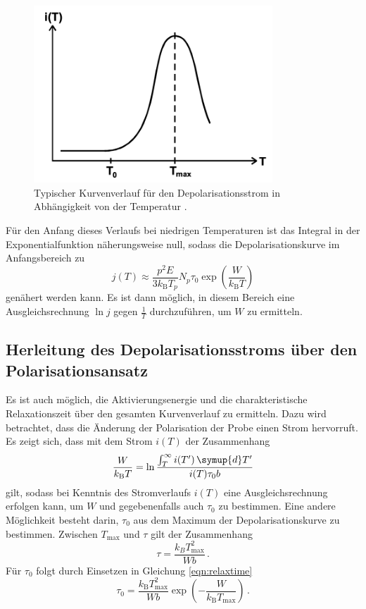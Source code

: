 \begin{figure}
  \centering
  \includegraphics[width=0.8\textwidth]{data/kurve.png}
  \caption{Typischer Kurvenverlauf für den Depolarisationsstrom in Abhängigkeit von der Temperatur \cite{anleitungalt}.}
  \label{fig:kurve}
\end{figure}

Für den Anfang dieses Verlaufs bei niedrigen Temperaturen ist das Integral in der Exponentialfunktion näherungsweise null, sodass die Depolarisationskurve im Anfangsbereich zu
\begin{equation}
  j(T) \approx \frac{p^2 E}{3 k_\text{B} T_p} {N_p}{\tau_0}
               \exp\left(\frac{W}{k_{\text{B}}T}\right)
               \label{eqn:naeherung}
\end{equation}
genähert werden kann. Es ist dann möglich, in diesem Bereich eine Ausgleichsrechnung $\ln j$ gegen $\frac{1}{T}$ durchzuführen, um $W$ zu ermitteln.

\subsection{Herleitung des Depolarisationsstroms über den Polarisationsansatz}
\label{subsec:polAnsatz}

Es ist auch möglich, die Aktivierungsenergie und die charakteristische Relaxationszeit über den gesamten Kurvenverlauf zu ermitteln. Dazu wird betrachtet, dass die Änderung der Polarisation der Probe einen Strom hervorruft.
Es zeigt sich, dass mit dem Strom $i(T)$ der Zusammenhang
\begin{equation}
  \frac{W}{k_\text{B}T} = \ln \frac{\int_T^\infty i(T')\,\symup{d}T'}{i(T) \tau_0 b}
  \label{eqn:polAnsatz}
\end{equation}
gilt, sodass bei Kenntnis des Stromverlaufs $i(T)$ eine Ausgleichsrechnung erfolgen kann, um $W$ und gegebenenfalls auch $\tau_0$ zu bestimmen.
Eine andere Möglichkeit besteht darin, $\tau_0$ aus dem Maximum der Depolarisationskurve zu bestimmen.
Zwischen $T_{\text{max}}$ und $\tau$ gilt der Zusammenhang
\begin{equation}
	\tau=\frac{k_B T_{\text{max}}^2}{W b} \,.
\end{equation}
Für $\tau_0$ folgt durch Einsetzen in Gleichung \eqref{eqn:relaxtime}
\begin{equation}
  \tau_0 = \frac{k_\text{B}T_{\text{max}}^2}{Wb}\exp\left(-\frac{W}{k_\text{B}T_\text{max}}\right)
  \label{eqn:tau_0}\,.
\end{equation}
